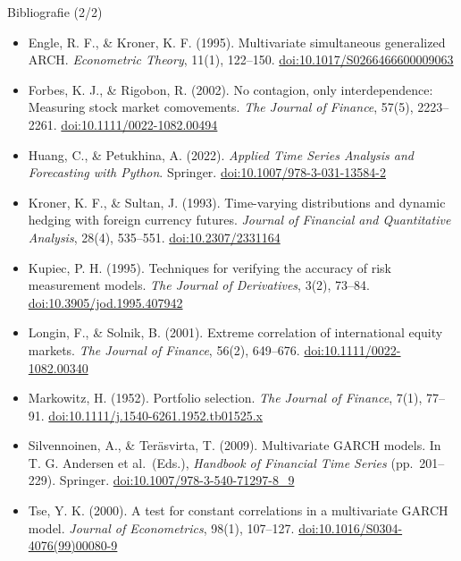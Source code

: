 \begin{frame}{Bibliografie (2/2)}
\itemsize{\scriptsize}
\begin{itemize}
    \item Engle, R. F., \& Kroner, K. F. (1995). Multivariate simultaneous generalized ARCH. \textit{Econometric Theory}, 11(1), 122--150. \href{https://doi.org/10.1017/S0266466600009063}{doi:10.1017/S0266466600009063}
    \item Forbes, K. J., \& Rigobon, R. (2002). No contagion, only interdependence: Measuring stock market comovements. \textit{The Journal of Finance}, 57(5), 2223--2261. \href{https://doi.org/10.1111/0022-1082.00494}{doi:10.1111/0022-1082.00494}
    \item Huang, C., \& Petukhina, A. (2022). \textit{Applied Time Series Analysis and Forecasting with Python}. Springer. \href{https://doi.org/10.1007/978-3-031-13584-2}{doi:10.1007/978-3-031-13584-2}
    \item Kroner, K. F., \& Sultan, J. (1993). Time-varying distributions and dynamic hedging with foreign currency futures. \textit{Journal of Financial and Quantitative Analysis}, 28(4), 535--551. \href{https://doi.org/10.2307/2331164}{doi:10.2307/2331164}
    \item Kupiec, P. H. (1995). Techniques for verifying the accuracy of risk measurement models. \textit{The Journal of Derivatives}, 3(2), 73--84. \href{https://doi.org/10.3905/jod.1995.407942}{doi:10.3905/jod.1995.407942}
    \item Longin, F., \& Solnik, B. (2001). Extreme correlation of international equity markets. \textit{The Journal of Finance}, 56(2), 649--676. \href{https://doi.org/10.1111/0022-1082.00340}{doi:10.1111/0022-1082.00340}
    \item Markowitz, H. (1952). Portfolio selection. \textit{The Journal of Finance}, 7(1), 77--91. \href{https://doi.org/10.1111/j.1540-6261.1952.tb01525.x}{doi:10.1111/j.1540-6261.1952.tb01525.x}
    \item Silvennoinen, A., \& Teräsvirta, T. (2009). Multivariate GARCH models. In T. G. Andersen et al.\ (Eds.), \textit{Handbook of Financial Time Series} (pp.~201--229). Springer. \href{https://doi.org/10.1007/978-3-540-71297-8_9}{doi:10.1007/978-3-540-71297-8\_9}
    \item Tse, Y. K. (2000). A test for constant correlations in a multivariate GARCH model. \textit{Journal of Econometrics}, 98(1), 107--127. \href{https://doi.org/10.1016/S0304-4076(99)00080-9}{doi:10.1016/S0304-4076(99)00080-9}
\end{itemize}
\end{frame}


